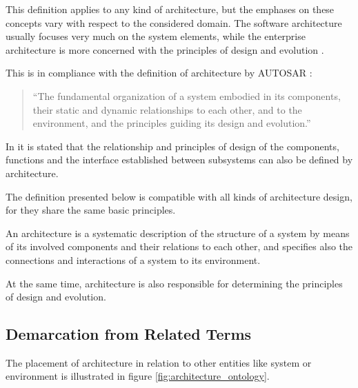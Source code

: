 This definition applies to any kind of architecture, but the emphases on these concepts vary with respect to the considered domain. The software architecture usually focuses very much on the system elements, while the enterprise architecture is more concerned with the principles of design and evolution \cite{ISO_42010}.

This is in compliance with the definition of architecture by \mbox{AUTOSAR} \cite{autosar_glossary}:
\begin{quote}
``The fundamental organization of a system embodied in its components, their static and dynamic relationships to each other, and to the environment, and the principles guiding its design and evolution.''
\end{quote}

In \cite{rodrigues2011} it is stated that the relationship and principles of design of the components, functions and the interface established between subsystems can also be defined by architecture.

The definition presented below is compatible with all kinds of architecture design, for they share the same basic principles.

\begin{myquote}
An architecture is a systematic description of the structure of a system by means of its involved components and their relations to each other, and specifies also the connections and interactions of a system to its environment.

At the same time, architecture is also responsible for determining the principles of design and evolution.
\end{myquote}


\subsection{Demarcation from Related Terms}
The placement of architecture in relation to other entities like system or environment is illustrated in figure \ref{fig:architecture_ontology}. 

